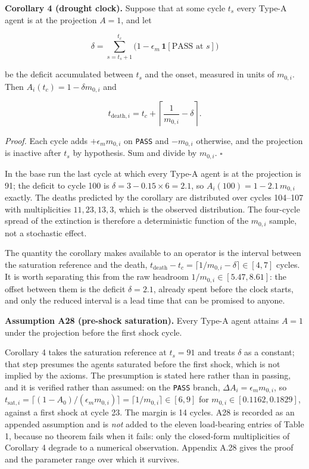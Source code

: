 \documentclass[11pt,a4paper]{article}
\begin{document}
\textbf{Corollary 4 (drought clock).} Suppose that at some cycle \(t_s\) every Type-A
agent is at the projection \(A=1\), and let

\[
\delta=\sum_{s=t_s+1}^{t_c}\Big(1-\epsilon_m\,\mathbf{1}[\text{PASS at }s]\Big)
\]

be the deficit accumulated between \(t_s\) and the onset, measured in units of
\(m_{0,i}\). Then \(A_i(t_c)=1-\delta m_{0,i}\) and

\[
t_{\mathrm{death},i}=t_c+\left\lceil \frac{1}{m_{0,i}}-\delta \right\rceil .
\]

\emph{Proof.} Each cycle adds \(+\epsilon_m m_{0,i}\) on \texttt{PASS} and \(-m_{0,i}\) otherwise,
and the projection is inactive after \(t_s\) by hypothesis. Sum and divide by
\(m_{0,i}\). \(\square\)

In the base run the last cycle at which every Type-A agent is at the projection is
91; the deficit to cycle 100 is \(\delta=3-0.15\times6=2.1\), so
\(A_i(100)=1-2.1\,m_{0,i}\) exactly. The deaths predicted by the corollary are
distributed over cycles 104--107 with multiplicities \(11,23,13,3\), which is the
observed distribution. The four-cycle spread of the extinction is therefore a
deterministic function of the \(m_{0,i}\) sample, not a stochastic effect.

The quantity the corollary makes available to an operator is the interval between
the saturation reference and the death,
\(t_{\mathrm{death}}-t_c=\lceil 1/m_{0,i}-\delta\rceil\in[4,7]\) cycles. It is worth
separating this from the raw headroom \(1/m_{0,i}\in[5.47,8.61]\): the offset between
them is the deficit \(\delta=2.1\), already spent before the clock starts, and only
the reduced interval is a lead time that can be promised to anyone.

\textbf{Assumption A28 (pre-shock saturation).} Every Type-A agent attains \(A=1\) under
the projection before the first shock cycle.

Corollary 4 takes the saturation reference at \(t_s=91\) and treats \(\delta\) as a
constant; that step presumes the agents saturated before the first shock, which is
not implied by the axioms. The presumption is stated here rather than in passing,
and it is verified rather than assumed: on the \texttt{PASS} branch,
\(\Delta A_i=\epsilon_m m_{0,i}\), so
\(t_{\mathrm{sat},i}=\lceil(1-A_0)/(\epsilon_m m_{0,i})\rceil=\lceil1/m_{0,i}\rceil
\in[6,9]\) for \(m_{0,i}\in[0.1162,0.1829]\), against a first shock at cycle 23. The
margin is 14 cycles. A28 is recorded as an appended assumption and is \emph{not} added
to the eleven load-bearing entries of Table 1, because no theorem fails when it
fails: only the closed-form multiplicities of Corollary 4 degrade to a numerical
observation. Appendix A.28 gives the proof and the parameter range over which it
survives.
\end{document}
